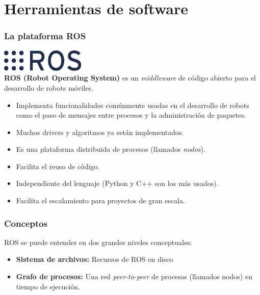 \section{Herramientas de software}

\begin{frame}\frametitle{La plataforma ROS}
  \includegraphics[width=0.3\textwidth]{Figures/Ros_logo.png}
  \[\]
  \textbf{ROS (Robot Operating System) } es un \textit{middleware} de código abierto para el desarrollo de robots móviles.
  \begin{itemize}
  \item Implementa funcionalidades comúnmente usadas en el desarrollo de robots como el paso de mensajes entre procesos y la administración de paquetes.
  \item Muchos drivers y algoritmos ya están implementados.
  \item Es una plataforma distribuida de procesos (llamados \textit{nodos}).
  \item Facilita el reuso de código.
  \item Independiente del lenguaje (Python y C++ son los más usados).
  \item Facilita el escalamiento para proyectos de gran escala. 
  \end{itemize}
\end{frame}

\begin{frame}\frametitle{Conceptos}
  ROS se puede entender en dos grandes niveles conceptuales:
  \begin{itemize}
  \item \textbf{Sistema de archivos:} Recursos de ROS en disco
  \item \textbf{Grafo de procesos:} Una red \textit{peer-to-peer} de procesos (llamados nodos) en tiempo de ejecución.
  \end{itemize}
\end{frame}

